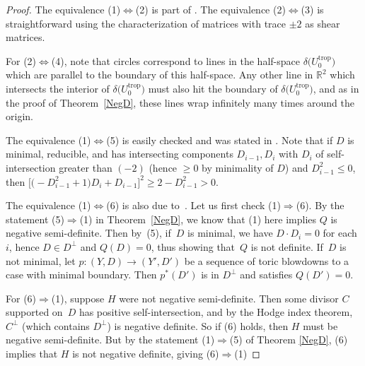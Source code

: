 \documentclass[pdftex]{sigma}
\numberwithin{equation}{section}
\numberwithin{figure}{section}
\numberwithin{table}{section}
\DeclareMathOperator{\trop}{trop}
\let\bb=\mathbb
\let\rar=\rightarrow
\theoremstyle{definition}
\begin{document}
\begin{proof}
The equivalence (1)$\Leftrightarrow$(2) is part of \cite[Lemma 1.5, arXiv v1]{GHK1}. The equivalence (2)$\Leftrightarrow$(3) is straightforward using the characterization of matrices with trace $\pm 2$ as shear matrices.

For (2)$\Leftrightarrow$(4), note that circles correspond to lines in the half-space $\delta\big(U_0^{\trop}\big)$ which are parallel to the boundary of this half-space. Any other line in $\bb{R}^2$ which intersects the interior of $\delta\big(U_0^{\trop}\big)$ must also hit the boundary of $\delta\big(U_0^{\trop}\big)$, and as in the proof of Theorem~\ref{NegD}, these lines wrap infinitely many times around the origin.

The equivalence (1)$\Leftrightarrow$(5) is easily checked and was stated in \cite[Section~0.5.2, arXiv v1]{GHK1}. Note that if $D$ is minimal, reducible, and has intersecting components $D_{i-1}, D_i$ with $D_i$ of self-inter\-section greater than $(-2)$ (hence $\geq 0$ by minimality of $D$) and $D_{i-1}^2\leq 0$, then $\big[\big({-}D_{i-1}^2+1\big)D_i+D_{i-1}\big]^2\geq 2-D_{i-1}^2 > 0$.

The equivalence (1)$\Leftrightarrow$(6) is also due to~\cite{GHK2}. Let us first check (1)$\Rightarrow$(6). By the statement (5)$\Rightarrow$(1) in Theorem~\ref{NegD}, we know that (1) here implies $Q$ is negative semi-definite. Then by~(5), if~$D$ is minimal, we have $D\cdot D_i=0$ for each $i$, hence $D\in D^{\perp}$ and $Q(D)=0$, thus showing that~$Q$ is not definite. If~$D$ is not minimal, let $p\colon (Y,D)\rar (Y',D')$ be a sequence of toric blowdowns to a case with minimal boundary. Then $p^*(D')$ is in $D^{\perp}$ and satisfies $Q(D')=0$.

For (6)$\Rightarrow$(1), suppose $H$ were not negative semi-definite. Then some divisor $C$ supported on~$D$ has positive self-intersection, and by the Hodge index theorem, $C^{\perp}$ (which contains $D^{\perp}$) is negative definite. So if (6) holds, then $H$ must be negative semi-definite. But by the statement (1)$\Rightarrow$(5) of Theorem \ref{NegD}, (6) implies that $H$ is not negative definite, giving (6)$\Rightarrow$(1)


\end{proof}
\end{document}
